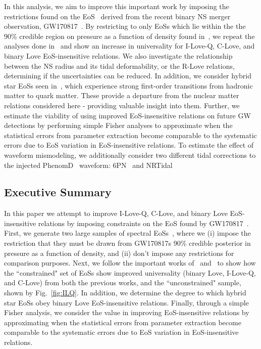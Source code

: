 \documentclass[prd,twocolumn,nofootinbib,superscriptaddress,amsmath,amssymb]{revtex4-1}
\begin{document}
In this analysis, we aim to improve this important work by imposing the restrictions found on the EoS~\cite{LIGO:posterior} derived from the recent binary NS merger observation, GW170817~\cite{TheLIGOScientific:2017qsa}.
By restricting to only EoSs which lie within the the 90\% credible region on pressure as a function of density found in~\cite{LIGO:posterior}, we repeat the analyses done in~\cite{Yagi:binLove,Yagi:ILQ} and show an increase in universality for I-Love-Q, C-Love, and binary Love EoS-insensitive relations.
We also investigate the relationship between the NS radius and its tidal deformability, or the R-Love relations, determining if the uncertainties can be reduced.
In addition, we consider hybrid star EoSs seen in~\cite{Paschalidis2018}, which experience strong first-order transitions from hadronic matter to quark matter.
These provide a departure from the nuclear matter relations considered here - providing valuable insight into them.
Further, we estimate the viability of using improved EoS-insensitive relations on future GW detections by performing simple Fisher analyses to approximate when the statistical errors from parameter extraction become comparable to the systematic errors due to EoS variation in EoS-insensitive relations.
To estimate the effect of waveform mismodeling, we additionally consider two different tidal corrections to the injected PhenomD~\cite{PhenomDI,PhenomDII} waveform: 6PN~\cite{Wade:tidalCorrections} and NRTidal~\cite{Samajdar:NRTidal}

\subsection{Executive Summary}
{}
In this paper we attempt to improve I-Love-Q, C-Love, and binary Love EoS-insensitive relations by imposing constraints on the EoS found by GW170817~\cite{LIGO:posterior,TheLIGOScientific:2017qsa}.
First, we generate two large samples of spectral EoSs~\cite{Lindblom:2018rfr}, where we (i) impose the restriction that they must be drawn from GW170817s 90\% credible posterior in pressure as a function of density, and (ii) don't impose any restrictions for comparison purposes.
Next, we follow the important works of~\cite{Yagi:binLove} and~\cite{Yagi:ILQ} to show how the ``constrained" set of EoSs show improved universality (binary Love, I-Love-Q, and C-Love) from both the previous works, and the ``unconstrained" sample, shown by Fig.~\ref{fig:ILQ}.
In addition, we determine the degree to which hybrid star EoSs obey binary Love EoS-insensitive relations.
Finally, through a simple Fisher analysis, we consider the value in improving EoS-insensitive relations by approximating when the statistical errors from parameter extraction become comparable to the systematic errors due to EoS variation in EoS-insensitive relations.
\end{document}
